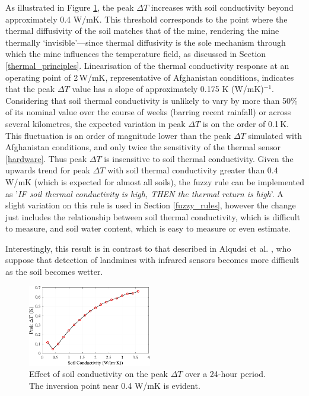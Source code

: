             As illustrated in Figure \ref{conductivity}, the peak \(\Delta T\) increases with soil conductivity beyond approximately 0.4 W/mK. This threshold corresponds to the point where the thermal diffusivity of the soil matches that of the mine, rendering the mine thermally ‘invisible’—since thermal diffusivity is the sole mechanism through which the mine influences the temperature field, as discussed in Section \ref{thermal_principles}. Linearisation of the thermal conductivity response at an operating point of 2\,W/mK, representative of Afghanistan conditions, indicates that the peak \(\Delta T\) value has a slope of approximately 0.175 K (W/mK)$^{-1}$. Considering that soil thermal conductivity is unlikely to vary by more than 50\% of its nominal value over the course of weeks (barring recent rainfall) or across several kilometres, the expected variation in peak \(\Delta T\) is on the order of 0.1\,K. This fluctuation is an order of magnitude lower than the peak \(\Delta T\) simulated with Afghanistan conditions, and only twice the sensitivity of the thermal sensor \ref{hardware}. Thus peak \(\Delta T\) is insensitive to soil thermal conductivity. Given the upwards trend for peak \(\Delta T\) with soil thermal conductivity greater than 0.4 W/mK (which is expected for almost all soils), the fuzzy rule can be implemented as '\textit{IF soil thermal conductivity is high, THEN the thermal return is high}'. A slight variation on this rule is used in Section \ref{fuzzy_rules}, however the change just includes the relationship between soil thermal conductivity, which is difficult to measure, and soil water content, which is easy to measure or even estimate. 
        
        Interestingly, this result is in contrast to that described in Alqudsi et al. \cite{alqudsi2021review}, who suppose that detection of landmines with infrared sensors becomes more difficult as the soil becomes wetter.

        \begin{figure}
            \centering
            \includegraphics[width=0.48\textwidth]{figs/Rory/thermal_sensitivity_conductivity.pdf}
            \caption[Effect of soil conductivity on the peak $\Delta T$ over a 24-hour period]{Effect of soil conductivity on the peak $\Delta T$ over a 24-hour period. The inversion point near 0.4 W/mK is evident.}
            \label{conductivity}
        \end{figure}
        